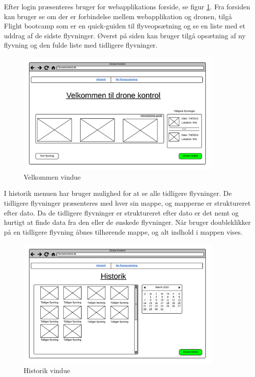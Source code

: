 Efter login præsenteres bruger for webapplikations forside, se figur \ref{fig:mockup_welcome}. 
Fra forsiden kan bruger se om der er forbindelse mellem webapplikation og dronen, tilgå Flight bootcamp som er en quick-guiden til flyveopsætning og se en liste med et uddrag af de sidste flyvninger. Øverst på siden kan bruger tilgå opsætning af ny flyvning og den fulde liste med tidligere flyvninger.

\vspace{-5pt}
 \begin{figure}[H]
 	\centering
 	\includegraphics[width=0.9\textwidth]{Billeder/UI_mockups/index.png}
 	\vspace{-.5cm}
 	\caption{Velkommen vindue}
 	\label{fig:mockup_welcome}
 \end{figure} 

I historik menuen har bruger mulighed for at se alle tidligere flyvninger. De tidligere flyvninger præsenteres med hver sin mappe, og mapperne er struktureret efter dato. Da de tidligere flyvninger er struktureret efter dato er det nemt og hurtigt at finde data fra den eller de ønskede flyvninger. Når bruger doubleklikker på en tidligere flyvning åbnes tilhørende mappe, og alt indhold i mappen vises.

\vspace{-5pt}
\begin{figure}[H]
	\centering
	\includegraphics[width=0.9\textwidth]{Billeder/UI_mockups/archive.png}
	\vspace{-.5cm}
	\caption{Historik vindue}
	\label{fig:mockup_archive}
\end{figure}

